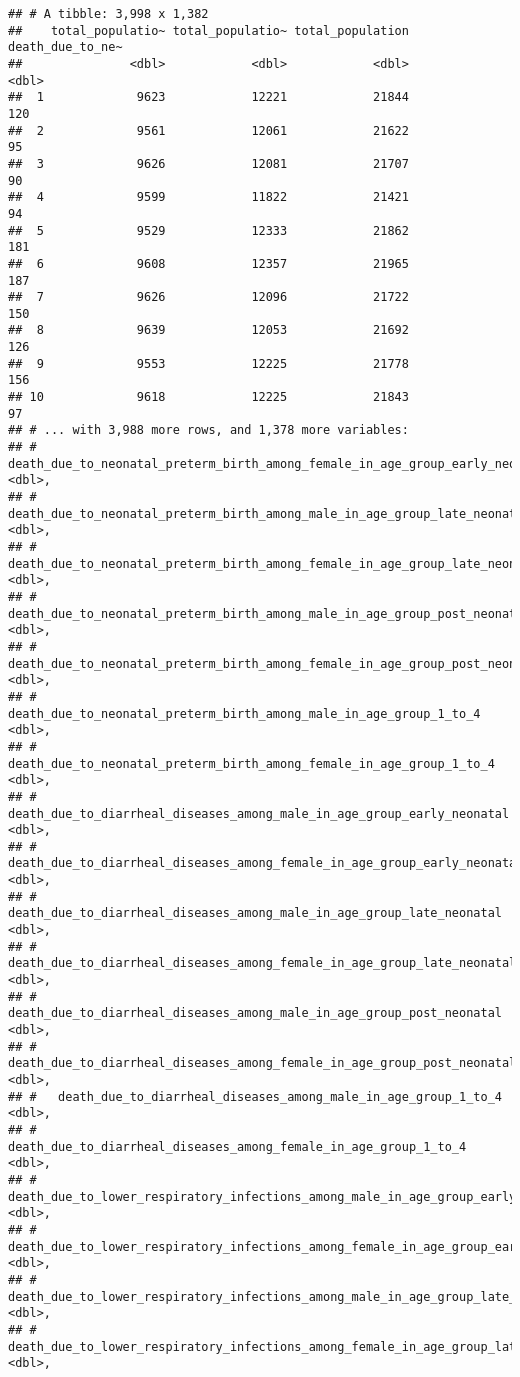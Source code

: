 \documentclass[]{article}
\begin{document}
\begin{verbatim}
## # A tibble: 3,998 x 1,382
##    total_populatio~ total_populatio~ total_population death_due_to_ne~
##               <dbl>            <dbl>            <dbl>            <dbl>
##  1             9623            12221            21844              120
##  2             9561            12061            21622               95
##  3             9626            12081            21707               90
##  4             9599            11822            21421               94
##  5             9529            12333            21862              181
##  6             9608            12357            21965              187
##  7             9626            12096            21722              150
##  8             9639            12053            21692              126
##  9             9553            12225            21778              156
## 10             9618            12225            21843               97
## # ... with 3,988 more rows, and 1,378 more variables:
## #   death_due_to_neonatal_preterm_birth_among_female_in_age_group_early_neonatal <dbl>,
## #   death_due_to_neonatal_preterm_birth_among_male_in_age_group_late_neonatal <dbl>,
## #   death_due_to_neonatal_preterm_birth_among_female_in_age_group_late_neonatal <dbl>,
## #   death_due_to_neonatal_preterm_birth_among_male_in_age_group_post_neonatal <dbl>,
## #   death_due_to_neonatal_preterm_birth_among_female_in_age_group_post_neonatal <dbl>,
## #   death_due_to_neonatal_preterm_birth_among_male_in_age_group_1_to_4 <dbl>,
## #   death_due_to_neonatal_preterm_birth_among_female_in_age_group_1_to_4 <dbl>,
## #   death_due_to_diarrheal_diseases_among_male_in_age_group_early_neonatal <dbl>,
## #   death_due_to_diarrheal_diseases_among_female_in_age_group_early_neonatal <dbl>,
## #   death_due_to_diarrheal_diseases_among_male_in_age_group_late_neonatal <dbl>,
## #   death_due_to_diarrheal_diseases_among_female_in_age_group_late_neonatal <dbl>,
## #   death_due_to_diarrheal_diseases_among_male_in_age_group_post_neonatal <dbl>,
## #   death_due_to_diarrheal_diseases_among_female_in_age_group_post_neonatal <dbl>,
## #   death_due_to_diarrheal_diseases_among_male_in_age_group_1_to_4 <dbl>,
## #   death_due_to_diarrheal_diseases_among_female_in_age_group_1_to_4 <dbl>,
## #   death_due_to_lower_respiratory_infections_among_male_in_age_group_early_neonatal <dbl>,
## #   death_due_to_lower_respiratory_infections_among_female_in_age_group_early_neonatal <dbl>,
## #   death_due_to_lower_respiratory_infections_among_male_in_age_group_late_neonatal <dbl>,
## #   death_due_to_lower_respiratory_infections_among_female_in_age_group_late_neonatal <dbl>,

\end{verbatim}
\end{document}
